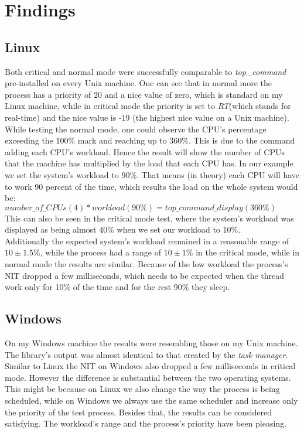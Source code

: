 \section{Findings}
\subsection{Linux}
Both critical and normal mode were successfully comparable to \textit{top\_command} pre-installed on every Unix machine. One can see that in normal more the process has a priority of 20 and a nice value of zero, which is standard on my Linux machine, while in critical mode the priority is set to \textit{RT}(which stands for real-time) and the nice value is -19 (the highest nice value on a Unix machine).\\
While testing the normal mode, one could observe the CPU's percentage exceeding the 100\% mark and reaching up to 360\%. This is due to the command adding each CPU's workload. Hence the result will show the number of CPUs that the machine has multiplied by the load that each CPU has. In our example we set the system's workload to 90\%. That means (in theory) each CPU will have to work 90 percent of the time, which results the load on the whole system would be:\vspace{1mm}\\
$number\_of\_CPUs(4) * workload(90\%) = top\_command\_display(360\%)$
\vspace{1mm}\\
This can also be seen in the critical mode test, where the system's workload was displayed as being almost 40\% when we set our workload to 10\%.\\
Additionally the expected system's workload remained in a reasonable range of $10 \pm 1.5\%$, while the process had a range of $10 \pm 1\%$ in the critical mode, while in normal mode the results are similar. Because of the low workload the process's NIT dropped a few milliseconds, which needs to be expected when the thread work only for 10\% of the time and for the rest 90\% they sleep.
\subsection{Windows}
On my Windows machine the results were resembling those on my Unix machine. The library's output was almost identical to that created by the \textit{task manager}. Similar to Linux the NIT on Windows also dropped a few milliseconds in critical mode. However the difference is substantial between the two operating systems. This might be because on Linux we also change the way the process is being scheduled, while on Windows we always use the same scheduler and increase only the priority of the test process. Besides that, the results can be considered satisfying. The workload's range and the process's priority have been pleasing.
